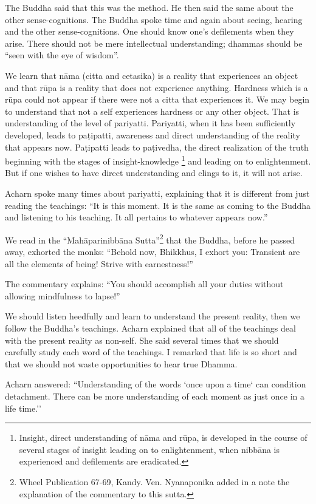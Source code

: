 The Buddha said that this was the method. He then said the same about
the other sense-cognitions. The Buddha spoke time and again about
seeing, hearing and the other sense-cognitions. One should know one's
defilements when they arise. There should not be mere intellectual
understanding; dhammas should be ``seen with the eye of wisdom''.

We learn that nāma (citta and cetasika) is a reality that experiences an
object and that rūpa is a reality that does not experience anything.
Hardness which is a rūpa could not appear if there were not a citta that
experiences it. We may begin to understand that not a self experiences
hardness or any other object. That is understanding of the level of
pariyatti. Pariyatti, when it has been sufficiently developed, leads to
paṭipatti, awareness and direct understanding of the reality that
appears now. Paṭipatti leads to paṭivedha, the direct realization of the
truth beginning with the stages of insight-knowledge
\footnote{Insight, direct
understanding of nāma and rūpa, is developed in the course of several
stages of insight leading on to enlightenment, when nibbāna is
experienced and defilements are eradicated.} and leading on to
enlightenment. But if one wishes to have direct understanding and clings
to it, it will not arise.

Acharn spoke many times about pariyatti, explaining that it is different
from just reading the teachings: ``It is this moment. It is the same as
coming to the Buddha and listening to his teaching. It all pertains to
whatever appears now.''

We read in the ``Mahāparinibbāna
Sutta''\footnote{Wheel Publication
67-69, Kandy. Ven. Nyanaponika added in a note the explanation of the
commentary to this sutta.} that the Buddha,
before he passed away, exhorted the monks: ``Behold now, Bhikkhus, I
exhort you: Transient are all the elements of being! Strive with
earnestness!''

The commentary explains: ``You should accomplish all your duties without
allowing mindfulness to lapse!''

We should listen heedfully and learn to understand the present reality,
then we follow the Buddha's teachings. Acharn explained that all of the
teachings deal with the present reality as non-self. She said several
times that we should carefully study each word of the teachings. I
remarked that life is so short and that we should not waste
opportunities to hear true Dhamma.

Acharn answered: ``Understanding of the words `once upon a time` can
condition detachment. There can be more understanding of each moment as
just once in a life time.''

